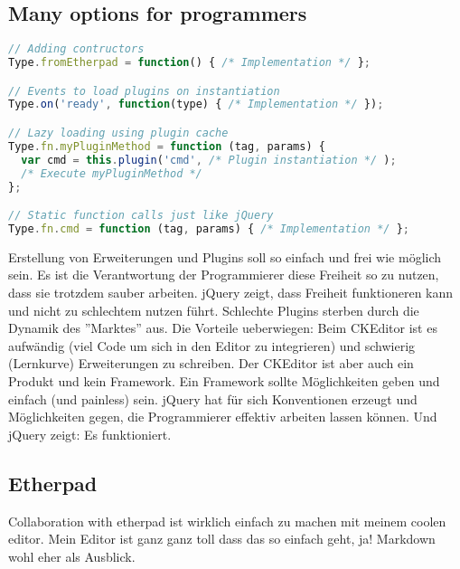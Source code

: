 \subsection{Many options for programmers}

\begin{lstlisting}[language=JavaScript, caption=Example calls to format text, label=lst:format-examples]
// Adding contructors
Type.fromEtherpad = function() { /* Implementation */ };

// Events to load plugins on instantiation
Type.on('ready', function(type) { /* Implementation */ });

// Lazy loading using plugin cache
Type.fn.myPluginMethod = function (tag, params) {
  var cmd = this.plugin('cmd', /* Plugin instantiation */ );
  /* Execute myPluginMethod */
};

// Static function calls just like jQuery
Type.fn.cmd = function (tag, params) { /* Implementation */ };
\end{lstlisting}

Erstellung von Erweiterungen und Plugins soll so einfach und frei wie möglich sein. Es ist die Verantwortung der Programmierer diese Freiheit so zu nutzen, dass sie trotzdem sauber arbeiten. jQuery zeigt, dass Freiheit funktioneren kann und nicht zu schlechtem nutzen führt. Schlechte Plugins sterben durch die Dynamik des ''Marktes'' aus. Die Vorteile ueberwiegen: Beim CKEditor ist es aufwändig (viel Code um sich in den Editor zu integrieren) und schwierig (Lernkurve) Erweiterungen zu schreiben. Der CKEditor ist aber auch ein Produkt und kein Framework. Ein Framework sollte Möglichkeiten geben und einfach (und painless) sein. jQuery hat für sich Konventionen erzeugt und Möglichkeiten gegen, die Programmierer effektiv arbeiten lassen können. Und jQuery zeigt: Es funktioniert.

\subsection{Etherpad} Collaboration with etherpad ist wirklich einfach zu machen mit meinem coolen editor. Mein Editor ist ganz ganz toll dass das so einfach geht, ja!
Markdown wohl eher als Ausblick.
